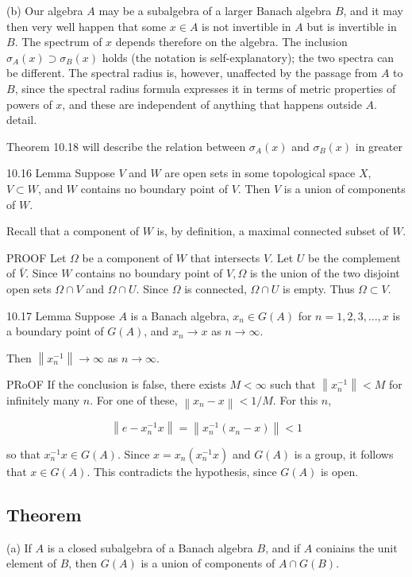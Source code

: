 \documentclass[10pt]{article}
\begin{document}
(b) Our algebra $A$ may be a subalgebra of a larger Banach algebra $B$, and it may then very well happen that some $x \in A$ is not invertible in $A$ but is invertible in $B$. The spectrum of $x$ depends therefore on the algebra. The inclusion $\sigma_{A}(x) \supset \sigma_{B}(x)$ holds (the notation is self-explanatory); the two spectra can be different. The spectral radius is, however, unaffected by the passage from $A$ to $B$, since the spectral radius formula expresses it in terms of metric properties of powers of $x$, and these are independent of anything that happens outside $A$. detail.

Theorem 10.18 will describe the relation between $\sigma_{A}(x)$ and $\sigma_{B}(x)$ in greater

10.16 Lemma Suppose $V$ and $W$ are open sets in some topological space $X$, $V \subset W$, and $W$ contains no boundary point of $V$. Then $V$ is a union of components of $W$.

Recall that a component of $W$ is, by definition, a maximal connected subset of $W$.

PROOF Let $\Omega$ be a component of $W$ that intersects $V$. Let $U$ be the complement of $\bar{V}$. Since $W$ contains no boundary point of $V, \Omega$ is the union of the two disjoint open sets $\Omega \cap V$ and $\Omega \cap U$. Since $\Omega$ is connected, $\Omega \cap U$ is empty. Thus $\Omega \subset V$.

10.17 Lemma Suppose $A$ is a Banach algebra, $x_{n} \in G(A)$ for $n=1,2,3, \ldots, x$ is a boundary point of $G(A)$, and $x_{n} \rightarrow x$ as $n \rightarrow \infty$.

Then $\left\|x_{n}^{-1}\right\| \rightarrow \infty$ as $n \rightarrow \infty$.

PRoOF If the conclusion is false, there exists $M<\infty$ such that $\left\|x_{n}^{-1}\right\|<M$ for infinitely many $n$. For one of these, $\left\|x_{n}-x\right\|<1 / M$. For this $n$,

$$
\left\|e-x_{n}^{-1} x\right\|=\left\|x_{n}^{-1}\left(x_{n}-x\right)\right\|<1
$$

so that $x_{n}^{-1} x \in G(A)$. Since $x=x_{n}\left(x_{n}^{-1} x\right)$ and $G(A)$ is a group, it follows that $x \in G(A)$. This contradicts the hypothesis, since $G(A)$ is open.

\subsection{Theorem}
(a) If $A$ is a closed subalgebra of a Banach algebra $B$, and if $A$ coniains the unit element of $B$, then $G(A)$ is a union of components of $A \cap G(B)$.
\end{document}
